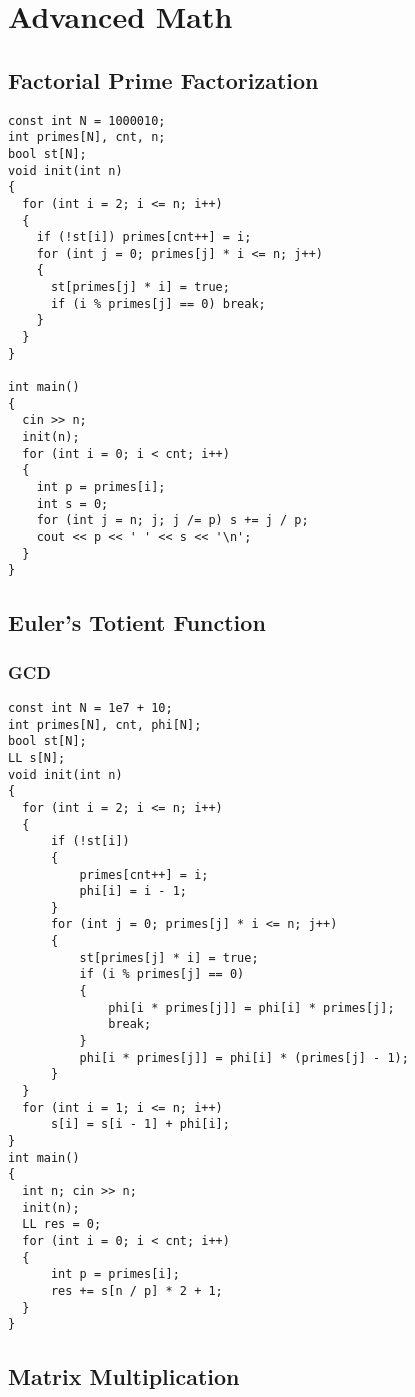 \chapter{Advanced Math}\label{chap:AdvancedMath}
\section{Factorial Prime Factorization}
\begin{lstlisting}
const int N = 1000010;
int primes[N], cnt, n;
bool st[N];
void init(int n)
{
  for (int i = 2; i <= n; i++)
  {
    if (!st[i]) primes[cnt++] = i;
    for (int j = 0; primes[j] * i <= n; j++)
    {
      st[primes[j] * i] = true;
      if (i % primes[j] == 0) break;
    }
  }
}

int main()
{
  cin >> n;
  init(n);
  for (int i = 0; i < cnt; i++)
  {
    int p = primes[i];
    int s = 0;
    for (int j = n; j; j /= p) s += j / p;
    cout << p << ' ' << s << '\n';
  }
}
\end{lstlisting}
\section{Euler's Totient Function}
\subsection{GCD}
\begin{lstlisting}
const int N = 1e7 + 10;
int primes[N], cnt, phi[N];
bool st[N];
LL s[N];
void init(int n)
{
  for (int i = 2; i <= n; i++)
  {
      if (!st[i])
      {
          primes[cnt++] = i;
          phi[i] = i - 1;
      }
      for (int j = 0; primes[j] * i <= n; j++)
      {
          st[primes[j] * i] = true;
          if (i % primes[j] == 0)
          {
              phi[i * primes[j]] = phi[i] * primes[j];
              break;
          }
          phi[i * primes[j]] = phi[i] * (primes[j] - 1);
      }
  }
  for (int i = 1; i <= n; i++)
      s[i] = s[i - 1] + phi[i];
}
int main()
{
  int n; cin >> n;
  init(n);
  LL res = 0;
  for (int i = 0; i < cnt; i++)
  {
      int p = primes[i];
      res += s[n / p] * 2 + 1;
  }
}
\end{lstlisting}
\section{Matrix Multiplication}
